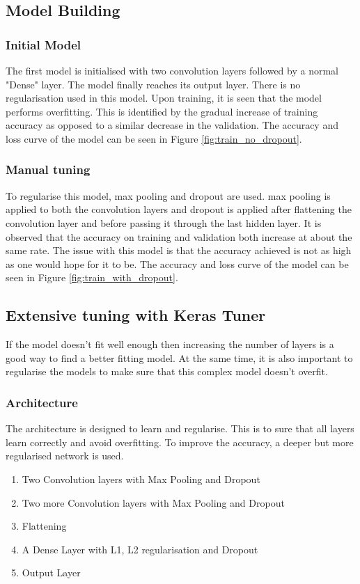 \documentclass[conference, compsoc]{IEEEtran}
\begin{document}
\subsection{Model Building}
\subsubsection{Initial Model}
The first model is initialised with two convolution layers followed by a normal "Dense" layer. The model finally reaches its output layer. There is no regularisation used in this model. Upon training, it is seen that the model performs overfitting. This is identified by the gradual increase of training accuracy as opposed to a similar decrease in the validation. The accuracy and loss curve of the model can be seen in Figure \ref{fig:train_no_dropout}.


\subsubsection{Manual tuning}
To regularise this model, max pooling and dropout are used. max pooling is applied to both the convolution layers and dropout is applied after flattening the convolution layer and before passing it through the last hidden layer. It is observed that the accuracy on training and validation both increase at about the same rate. The issue with this model is that the accuracy achieved is not as high as one would hope for it to be. The accuracy and loss curve of the model can be seen in Figure \ref{fig:train_with_dropout}.

\subsection{Extensive tuning with Keras Tuner}
If the model doesn't fit well enough then increasing the number of layers is a good way to find a better fitting model. At the same time, it is also important to regularise the models to make sure that this complex model doesn't overfit. 

\subsubsection{Architecture}
The architecture is designed to learn and regularise. This is to sure that all layers learn correctly and avoid overfitting. To improve the accuracy, a deeper but more regularised network is used.
\begin{enumerate}
    \item Two Convolution layers with Max Pooling and Dropout
    \item Two more Convolution layers with Max Pooling and Dropout
    \item Flattening
    \item A Dense Layer with L1, L2 regularisation and Dropout
    \item Output Layer
\end{enumerate}
\end{document}
